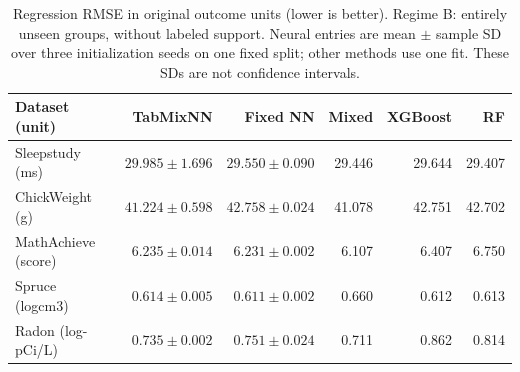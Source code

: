 \begin{table}[htbp]
\centering
\small
\caption{Regression RMSE in original outcome units (lower is better). Regime B: entirely unseen groups, without labeled support. Neural entries are mean $\pm$ sample SD over three initialization seeds on one fixed split; other methods use one fit. These SDs are not confidence intervals.}
\label{tab:regression_B}
\begin{tabular}{lrrrrr}
\toprule
Dataset (unit) & TabMixNN & Fixed NN & Mixed & XGBoost & RF \\
\midrule
Sleepstudy (ms) & $29.985 \pm 1.696$ & $29.550 \pm 0.090$ & 29.446 & 29.644 & 29.407 \\
ChickWeight (g) & $41.224 \pm 0.598$ & $42.758 \pm 0.024$ & 41.078 & 42.751 & 42.702 \\
MathAchieve (score) & $6.235 \pm 0.014$ & $6.231 \pm 0.002$ & 6.107 & 6.407 & 6.750 \\
Spruce (logcm3) & $0.614 \pm 0.005$ & $0.611 \pm 0.002$ & 0.660 & 0.612 & 0.613 \\
Radon (log-pCi/L) & $0.735 \pm 0.002$ & $0.751 \pm 0.024$ & 0.711 & 0.862 & 0.814 \\
\bottomrule
\end{tabular}
\end{table}

